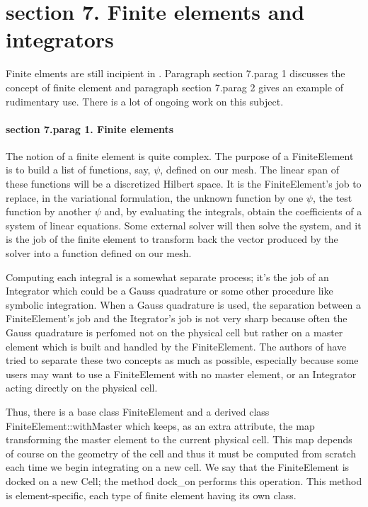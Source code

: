 \section{\numb section 7. Finite elements and integrators}


Finite elments are still incipient in \maniFEM.
Paragraph \numb section 7.\numb parag 1 discusses the concept of finite element
and paragraph \numb section 7.\numb parag 2 gives an example of rudimentary use.
There is a lot of ongoing work on this subject.


\paragraph{\numb section 7.\numb parag 1. Finite elements}

The notion of a finite element is quite complex.
The purpose of a {\codett FiniteElement} is to build a list of functions, say, $ \psi $,
defined on our mesh.
The linear span of these functions will be a discretized Hilbert space.
It is the {\codett FiniteElement}'s job to replace, in the variational formulation,
the unknown function by one $ \psi $, the test function by another $ \psi $ and,
by evaluating the integrals, obtain the coefficients of a system of linear equations.
Some external solver will then solve the system, and it is the job of the finite element
to transform back the vector produced by the solver into a function defined on our mesh.

Computing each integral is a somewhat separate process; it's the job of an {\codett Integrator}
which could be a Gauss quadrature or some other procedure like symbolic integration.
When a Gauss quadrature is used, the separation between a {\codett FiniteElement}'s job
and the {\codett Itegrator}'s job is not very sharp because often the Gauss quadrature is
perfomed not on the physical cell but rather on a master element which is built and
handled by the {\codett FiniteElement}.
The authors of {\maniFEM} have tried to separate these two concepts
as much as possible, especially because some users may want to use a {\codett FiniteElement}
with no master element, or an {\codett Integrator} acting directly on the physical cell.

Thus, there is a base class {\codett FiniteElement} and a derived class
{\codett FiniteElement::withMaster} which keeps, as an extra attribute, the map transforming
the master element to the current physical cell.
This map depends of course on the geometry of the cell and thus it must be computed from
scratch each time we begin integrating on a new cell.
We say that the {\codett FiniteElement} is docked on a new {\codett Cell};
the method {\codett dock\_on} performs this operation.
This method is element-specific, each type of finite element having its own class.

